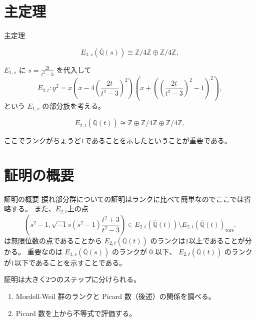 \documentclass{classes/mybeamer}
\begin{document}
\section{主定理}
\begin{frame}{主定理}
    \begin{proposition}[Y.]
        \begin{equation*}
            E_{1,s}(\overline{\mathbb{Q}}(s)) \cong \mathbb{Z} / 4 \mathbb{Z} \oplus \mathbb{Z} / 4 \mathbb{Z},
        \end{equation*}
    \end{proposition}
    \vspace{1em}

    $E_{1,s}$ に $s = \frac{2t}{t^{2} - 3}$ を代入して
    \begin{equation*}
        E_{2,t}: y^{2} = x \left(x - 4 \left(\frac{2t}{t^{2} - 3} \right)^{2} \right) \left(x + \left(\left(\frac{2t}{t^{2} - 3} \right)^{2} - 1 \right)^{2} \right),
    \end{equation*}
    という $E_{1,s}$ の部分族を考える。
    \begin{thm}[Y.]
        \begin{equation*}
            E_{2,t}(\overline{\mathbb{Q}}(t)) \cong \mathbb{Z} \oplus \mathbb{Z} / 4 \mathbb{Z} \oplus \mathbb{Z} / 4 \mathbb{Z},
        \end{equation*}
    \end{thm}
    ここでランクがちょうど$1$であることを示したということが重要である。
\end{frame}

\section{証明の概要}
\begin{frame}{証明の概要}
    捩れ部分群についての証明はランクに比べて簡単なのでここでは省略する。
    また、$E_{2,t}$上の点
    \begin{equation*}
        \left(s^{2} - 1, \sqrt{-1} s(s^{2} - 1) \frac{t^{2} + 3}{t^{2} - 3} \right) \in E_{2,t}(\overline{\mathbb{Q}}(t)) \setminus E_{2,t}(\overline{\mathbb{Q}}(t))_{\text{tors}}.
    \end{equation*}
    は無限位数の点であることから $E_{2,t}(\overline{\mathbb{Q}}(t))$ のランクは$1$以上であることが分かる。
    重要なのは $E_{1,s}(\overline{\mathbb{Q}}(s))$ のランクが $0$ 以下、 $ E_{2,t}(\overline{\mathbb{Q}}(t))$ のランクが$1$以下であることを示すことである。
    \vspace{1cm}

    証明は大きく2つのステップに分けられる。
    \begin{enumerate}
        \item Mordell-Weil 群のランクと Picard 数（後述）の関係を調べる。
        \item Picard 数を上から不等式で評価する。
    \end{enumerate}
\end{frame}
\end{document}
